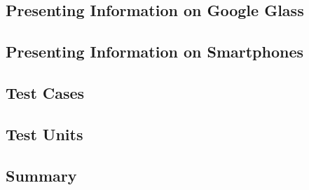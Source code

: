 

\label{subsec:application}


\subsection{Presenting Information on Google Glass}
\label{subsec:informationlimitedspace}


\subsection{Presenting Information on Smartphones}
\label{subsec:smartphones}


\subsection{Test Cases}
\label{subsec:testcases}


\subsection{Test Units}
\label{subsec:testunits}


\subsection{Summary}
\label{subsec:summary}
